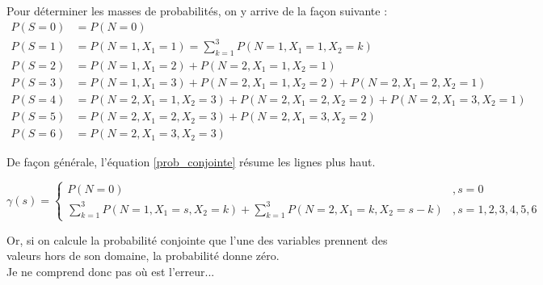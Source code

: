 \documentclass[11pt,letterpaper]{report}
\author{Alexandre Lepage}
\begin{document}
	Pour déterminer les masses de probabilités, on y arrive de la façon suivante :
	\begin{align}
		P(S=0) &= P(N=0) \nonumber \\
		P(S=1) &= P(N=1, X_1=1) = \sum_{k=1}^{3} P(N=1, X_1=1, X_2 = k) \nonumber \\
		P(S=2) &= P(N=1, X_1=2) + P(N=2, X_1=1, X_2=1) \nonumber \\
		P(S=3) &= P(N=1, X_1=3) + P(N=2, X_1=1, X_2=2) + P(N=2, X_1=2, X_2=1) \nonumber \\
		P(S=4) &= P(N=2, X_1=1, X_2=3) + P(N=2, X_1=2, X_2=2) + P(N=2, X_1=3, X_2=1) \nonumber \\
		P(S=5) &= P(N=2, X_1=2, X_2=3) + P(N=2, X_1=3, X_2=2) \nonumber \\
		P(S=6) &= P(N=2, X_1=3, X_2=3) \nonumber 
	\end{align}
	
	De façon générale, l'équation \eqref{prob_conjointe} résume les lignes plus haut.
	
	\begin{equation}
	\gamma(s) = 
		\left\{
			\begin{array}{ll}
				P(N=0) 																				& , s = 0 \\ 
				\sum_{k=1}^{3} P(N=1, X_1=s, X_2=k) + \sum_{k=1}^{3} P(N=2, X_1=k, X_2 = s-k)  		& , s = 1,2,3,4,5,6
			\end{array} 
		\right.\label{prob_conjointe}
	\end{equation} 
	
	Or, si on calcule la probabilité conjointe que l'une des variables prennent des valeurs hors de son domaine, la probabilité donne zéro.\\
	
	Je ne comprend donc pas où est l'erreur...
	
\end{document}
